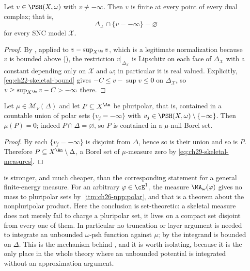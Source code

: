 \begin{proposition}
\label{prop:ch29-skeleton-not-polar}
Let \(v\in\PSH(X,\omega)\) with \(v\not\equiv-\infty\).  Then
\(v\) is finite at every point of every dual complex; that is,
\[
 \Delta_{\mathcal X}\cap\{v=-\infty\}=\varnothing
\]
for every SNC model \(\mathcal X\).
\end{proposition}

\begin{proof}
By , applied to
\(v-\sup_{X^{\An}}v\), which is a legitimate normalization because \(v\) is
bounded above (), the restriction
\(v|_{\Delta_{\mathcal X}}\) is Lipschitz on each face of
\(\Delta_{\mathcal X}\) with a constant depending only on
\(\mathcal X\) and \(\omega\); in particular it is real valued.  Explicitly,
\eqref{eq:ch22-skeletal-bound} gives
\(-C\leq v-\sup v\leq0\) on \(\Delta_{\mathcal X}\), so
\(v\geq\sup_{X^{\An}}v-C>-\infty\) there.
\end{proof}

\begin{proposition}
\label{prop:ch29-supported-no-polar-mass}
Let \(\mu\in\mathcal M_V(\Delta)\) and let
\(P\subseteq X^{\An}\) be pluripolar, that is, contained in a countable
union of polar sets \(\{v_j=-\infty\}\) with
\(v_j\in\PSH(X,\omega)\setminus\{-\infty\}\).  Then \(\mu(P)=0\); indeed
\(P\cap\Delta=\varnothing\), so \(P\) is contained in a \(\mu\)-null Borel
set.
\end{proposition}

\begin{proof}
By  each \(\{v_j=-\infty\}\) is disjoint
from \(\Delta\), hence so is their union and so is \(P\).  Therefore
\(P\subseteq X^{\An}\setminus\Delta\), a Borel set of \(\mu\)-measure zero
by \eqref{eq:ch29-skeletal-measures}.
\end{proof}

\begin{remark}
\label{rem:ch29-two-polar-statements}
 is stronger, and much cheaper,
than the corresponding statement for a general finite-energy measure.  For
an arbitrary \(\varphi\in\cE^1\), the measure \(\MA_\omega(\varphi)\) gives
no mass to pluripolar sets by
\,\cref{itm:ch26-npp:polar}, and that is a theorem
about the nonpluripolar product.  Here the conclusion is set-theoretic: a
skeletal measure does not merely fail to charge a pluripolar set, it lives
on a compact set disjoint from every one of them.  In particular no
truncation or layer argument is needed to integrate an unbounded
\(\omega\)-psh function against \(\mu\); by
 the integrand is bounded on
\(\Delta\).  This is the mechanism behind
, and it is worth isolating,
because it is the only place in the whole theory where an unbounded
potential is integrated without an approximation argument.
\end{remark}

